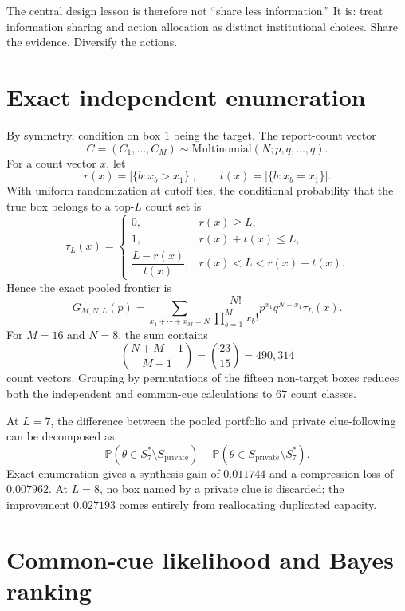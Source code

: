 \documentclass[11pt]{article}
\theoremstyle{definition}
\theoremstyle{remark}
\newcommand{\Prob}{\mathbb{P}}
\newcommand{\1}{\mathbf{1}}
\newcommand{\priv}{\mathrm{private}}
\begin{document}
The central design lesson is therefore not ``share less information.'' It is: treat information sharing and action allocation as distinct institutional choices. Share the evidence. Diversify the actions.

\appendix

\section{Exact independent enumeration}
\label{app:enumeration}

By symmetry, condition on box $1$ being the target. The report-count vector
\[
C=(C_1,\ldots,C_M)\sim\mathrm{Multinomial}(N;p,q,\ldots,q).
\]
For a count vector $x$, let
\[
r(x)=|\{b:x_b>x_1\}|,
\qquad
t(x)=|\{b:x_b=x_1\}|.
\]
With uniform randomization at cutoff ties, the conditional probability that the true box belongs to a top-$L$ count set is
\begin{equation}
\tau_L(x)=
\begin{cases}
0, & r(x)\ge L,\\
1, & r(x)+t(x)\le L,\\
\dfrac{L-r(x)}{t(x)}, & r(x)<L<r(x)+t(x).
\end{cases}
\label{eq:tie-inclusion}
\end{equation}
Hence the exact pooled frontier is
\begin{equation}
G_{M,N,L}(p)
=\sum_{x_1+\cdots+x_M=N}
\frac{N!}{\prod_{b=1}^M x_b!}
 p^{x_1}q^{N-x_1}\tau_L(x).
\label{eq:multinomial-frontier}
\end{equation}
For $M=16$ and $N=8$, the sum contains
\[
\binom{N+M-1}{M-1}=\binom{23}{15}=490{,}314
\]
count vectors. Grouping by permutations of the fifteen non-target boxes reduces both the independent and common-cue calculations to $67$ count classes.

At $L=7$, the difference between the pooled portfolio and private clue-following can be decomposed as
\[
\Prob(\theta\in S^*_7\setminus S_{\priv})
-\Prob(\theta\in S_{\priv}\setminus S^*_7).
\]
Exact enumeration gives a synthesis gain of $0.011744$ and a compression loss of $0.007962$. At $L=8$, no box named by a private clue is discarded; the improvement $0.027193$ comes entirely from reallocating duplicated capacity.

\section{Common-cue likelihood and Bayes ranking}
\label{app:likelihood}
\end{document}
